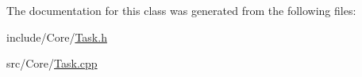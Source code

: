 The documentation for this class was generated from the following files\+:\begin{DoxyCompactItemize}
\item 
include/\+Core/\hyperlink{_task_8h}{Task.\+h}\item 
src/\+Core/\hyperlink{_task_8cpp}{Task.\+cpp}\end{DoxyCompactItemize}

